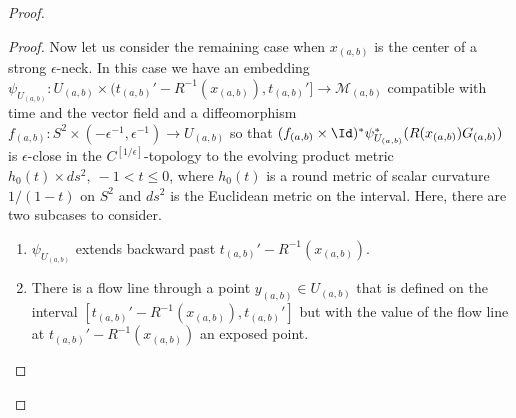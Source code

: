 \begin{proof}
\begin{proof}
Now let us consider the remaining case when $x_{(a,b)}$ is the
center of a strong $\epsilon$-neck. In this case we have an
embedding $\psi_{U_{(a,b)}}\colon
U_{(a,b)}\times({t_{(a,b)}'}-R^{-1}(x_{(a,b)}),t_{(a,b)}']\to
{\mathcal M}_{(a,b)}$ compatible with time and the vector field and
a diffeomorphism $f_{(a,b)}\colon S^2\times
(-\epsilon^{-1},\epsilon^{-1})\to U_{(a,b)}$ so that $
(f_{(a,b)}\times\Id)^*\psi_{U_{(a,b)}}^*(R({x_{(a,b)}})G_{(a,b)})$ is
$\epsilon$-close in the $C^{[1/\epsilon]}$-topology to the
evolving product metric $h_0(t)\times ds^2,\ -1<t\le 0$, where $h_0(t)$
is a round metric of scalar curvature $1/(1-t)$ on $S^2$ and $ds^2$
is the Euclidean metric on the interval. Here, there are two
subcases to consider.
\begin{enumerate}
\item[(i)] $\psi_{U_{(a,b)}}$ extends backward past $
t_{(a,b)}'-R^{-1}(x_{(a,b)})$.
\item[(ii)] There is a flow line through a point $y_{(a,b)}\in U_{(a,b)}$ that is defined
on the interval $[t_{(a,b)}'-R^{-1}(x_{(a,b)}),t_{(a,b)}']$ but with
the value of the flow line at $t_{(a,b)}'-R^{-1}(x_{(a,b)})$ an
exposed point.
\end{enumerate}


\end{proof}
\end{proof}
